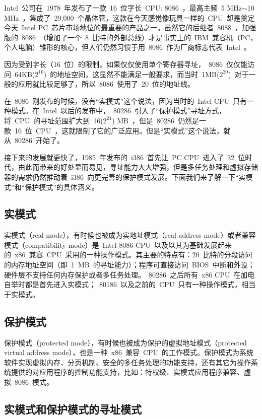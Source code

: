 Intel~公司在~1978~年发布了一款~16~位字长~CPU: 8086~，最高主频~5 MHz$\sim$10 MHz~，集成了~29,000~个晶体管，这款在今天感觉像玩具一样的~CPU~却是奠定今天~Intel PC~芯片市场地位的最重要的产品之一。虽然它的后继者~8088~，加强版的~8086~（增加了一个~8~比特的外部总线）才是事实上的~IBM~兼容机（PC，个人电脑）雏形的核心，但人们仍然习惯于用~8086~作为厂商标志代表~Intel~。

因为受到字长（16~位）的限制，如果仅仅使用单个寄存器寻址，~8086~仅仅能访问~64KB($2^{16}$)~的地址空间，这显然不能满足一般要求，而当时~1MB($2^{20}$)~对于一般的应用就比较足够了，所以~8086~使用了~20~位的地址线。

在~8086~刚发布的时候，没有“实模式”这个说法，因为当时的~Intel CPU~只有一种模式。在~Intel~以后的发布中，~80286~引入了“保护模式”寻址方式，将~CPU~的寻址范围扩大到~16($2^{24}$) MB~，但是~80286~仍然是一款~16~位~CPU~，这就限制了它的广泛应用。但是“实模式”这个说法，就从~80286~开始了。

接下来的发展就更快了，1985~年发布的~i386~首先让~PC CPU~进入了~32~位时代，由此而带来的好处显而易见，寻址能力大大增强，但是多任务处理和虚拟存储器的需求仍然推动着~i386~向更完善的保护模式发展。下面我们来了解一下“实模式”和“保护模式”的具体涵义。

\subsection{实模式}

实模式（real mode），有时候也被成为实地址模式（real address mode）或者兼容模式（compatibility mode）是~Intel 8086 CPU~以及以其为基础发展起来的~x86~兼容~CPU~采用的一种操作模式。其主要的特点有：20~比特的分段访问的内存地址空间（即~1~MB~的寻址能力）；程序可直接访问~BIOS~中断和外设；硬件层不支持任何内存保护或者多任务处理。~80286~之后所有~x86 CPU~在加电自举时都是首先进入实模式；~80186~以及之前的~CPU~只有一种操作模式，相当于实模式。

\subsection{保护模式}

保护模式（protected mode），有时候也被成为保护的虚拟地址模式（protected virtual address mode），也是一种~x86~兼容~CPU~的工作模式。保护模式为系统软件实现虚拟内存、分页机制、安全的多任务处理的功能支持，还有其它为操作系统提供的对应用程序的控制功能支持，比如：特权级、实模式应用程序兼容、虚拟~8086~模式。

\subsection{实模式和保护模式的寻址模式}

